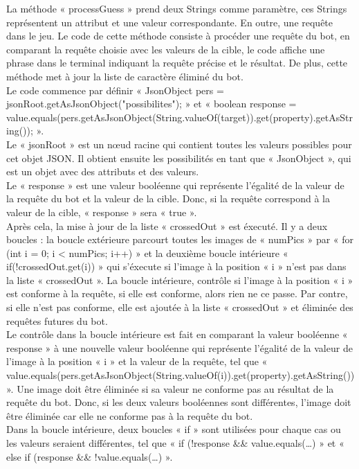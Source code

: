 \documentclass[a4paper]{article}
\begin{document}
La méthode « processGuess » prend deux Strings comme paramètre, ces Strings représentent un attribut et une valeur correspondante. En outre, une requête dans le jeu. Le code de cette méthode consiste à procéder une requête du bot, en comparant la requête choisie avec les valeurs de la cible, le code affiche une phrase dans le terminal indiquant la requête précise et le résultat. De plus, cette méthode met à jour la liste de caractère éliminé du bot.\\
Le code commence par définir « JsonObject pers = jsonRoot.getAsJsonObject("possibilites"); » et « boolean response = value.equals(pers.getAsJsonObject(String.valueOf(target)).get(property).getAsString()); ».\\
Le « jsonRoot » est un nœud racine qui contient toutes les valeurs possibles pour cet objet JSON. Il obtient ensuite les possibilités en tant que « JsonObject », qui est un objet avec des attributs et des valeurs.\\
Le « response » est une valeur booléenne qui représente l’égalité de la valeur de la requête du bot et la valeur de la cible. Donc, si la requête correspond à la valeur de la cible, « response » sera « true ».\\

Après cela, la mise à jour de la liste « crossedOut » est éxecuté. Il y a deux boucles : la boucle extérieure parcourt toutes les images de « numPics » par « for (int i = 0; i < numPics; i++) » et la deuxième boucle intérieure « if(!crossedOut.get(i)) » qui s’éxecute si l’image à la position « i » n’est pas dans la liste « crossedOut ». La boucle intérieure, contrôle si l’image à la position « i » est conforme à la requête, si elle est conforme, alors rien ne ce passe. Par contre, si elle n’est pas conforme, elle est ajoutée à la liste « crossedOut » et éliminée des requêtes futures du bot.\\
Le contrôle dans la boucle intérieure est fait en comparant la valeur booléenne « response » à une nouvelle valeur booléenne qui représente l’égalité de la valeur de l’image à la position « i » et la valeur de la requête, tel que « value.equals(pers.getAsJsonObject(String.valueOf(i)).get(property).getAsString()) ». Une image doit être éliminée si sa valeur ne conforme pas au résultat de la requête du bot. Donc, si les deux valeurs booléennes sont différentes, l’image doit être éliminée car elle ne conforme pas à la requête du bot.\\
Dans la boucle intérieure, deux boucles « if » sont utilisées pour chaque cas ou les valeurs seraient différentes, tel que « if (!response \&\& value.equals(…) » et « else if (response \&\& !value.equals(…) ».\\
\end{document}
